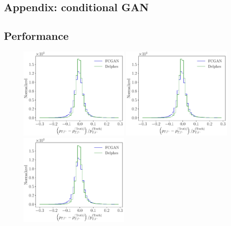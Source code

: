 \begin{appendices}
\chapter{Appendix: conditional GAN}\label{chap:fcga)app}
\section{Performance}
\label{sec:app1}

\begin{figure}[b!]
\centering
\includegraphics[page = 2, width=0.49\textwidth]{figures/cGAN/pull_full}
\includegraphics[page = 3, width=0.49\textwidth]{figures/cGAN/pull_full} \\
\includegraphics[page = 1, width=0.49\textwidth]{figures/cGAN/pull_full}

\end{figure}
\end{appendices}
